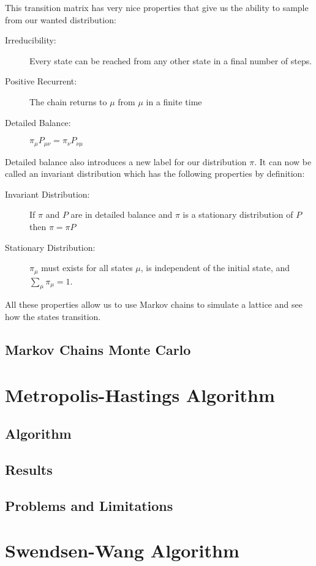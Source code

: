 \documentclass[a4]{scrartcl}
\begin{document}
This transition matrix has very nice properties that give us the ability to sample from our wanted distribution:
\begin{description}
	\item[Irreducibility:] Every state can be reached from any other state in a final number of steps.
	\item[Positive Recurrent:] The chain returns to $\mu$ from $\mu$ in a finite time
	\item[Detailed Balance:] $ \pi_\mu P_{\mu \nu} = \pi_\nu P_{\nu \mu} $
\end{description}
Detailed balance also introduces a new label for our distribution $\pi$. It can now be called an invariant distribution which has the following properties by definition:
\begin{description}
	\item[Invariant Distribution:] If $\pi$ and $P$ are in detailed balance and $\pi$ is a stationary distribution of $P$ then $\pi = \pi P$
	\item[Stationary Distribution:] $\pi_\mu$ must exists for all states $\mu$, is independent of the initial state, and $ \sum_\mu \pi_\mu = 1 $. 
\end{description}

All these properties allow us to use Markov chains to simulate a lattice and see how the states transition. 
\subsection{Markov Chains Monte Carlo}
	

\section{Metropolis-Hastings Algorithm}
\subsection{Algorithm}

\subsection{Results}

\subsection{Problems and Limitations}

\section{Swendsen-Wang Algorithm}
\end{document}
